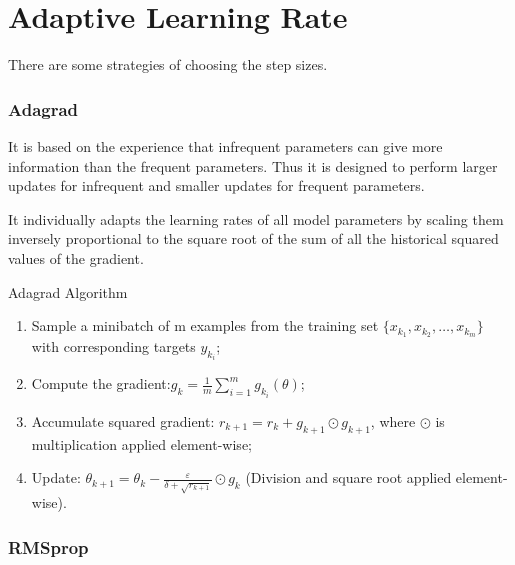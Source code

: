 \documentclass[11pt]{article} %
\begin{document}
\section{Adaptive Learning Rate}

There are some strategies of choosing the step sizes.

\subsubsection{Adagrad}
It is based on the experience that infrequent parameters can give more information than the frequent parameters.
Thus it is designed to perform larger updates for infrequent and smaller updates for frequent parameters.

It individually adapts the learning rates of all model parameters by scaling them inversely proportional to the square root of the sum of all the historical squared values of the gradient.
\begin{algorithm}[htb]
\caption{Adagrad Algorithm}
\label{Adagrad}

  \begin{enumerate}
  \item Sample a minibatch of m examples from the training set $\{x_{k_1}, x_{k_2}, \dots, x_{k_m}\}$ with corresponding targets $y_{k_i}$;
  \item Compute the gradient:$g_{k} = \frac{1}{m}\sum_{i=1}^{m}g_{k_{i}}({\theta})$;
  \item Accumulate squared gradient: $r_{k+1}= r_k+ g_{k+1}\odot g_{k+1}$, where $\odot$ is multiplication applied element-wise;
  \item Update: ${\theta}_{k+1}={\theta}_k - \frac{\varepsilon}{\delta + \sqrt{r_{k+1}}}\odot g_k$ (Division and square root applied element-wise).
\end{enumerate}
\end{algorithm}

\subsubsection{RMSprop}
\end{document}
